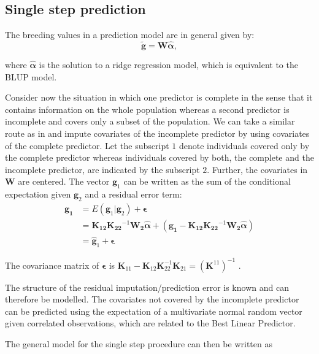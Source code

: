 \documentclass[12pt,titlepage]{article}
\begin{document}
\subsection{Single step prediction}
The breeding values in a prediction model are in general given by:
\begin{equation} \label{eq:mrnaebv}
	\mathbf{\tilde{g}} = \mathbf{W}\boldsymbol{\hat{\alpha}},
\end{equation}

where $\boldsymbol{\hat{\alpha}}$ is the solution to a ridge regression model,
which is equivalent to the BLUP model.

Consider now the situation in which one predictor is complete in the sense that
it contains information on the whole population whereas a second predictor is
incomplete and covers only a subset of the population.
We can take a similar route as in  and impute covariates 
of the incomplete predictor by using covariates of the complete predictor.
Let the subscript $1$ denote individuals covered only by the complete
predictor whereas individuals covered by both, the complete and the
incomplete predictor, are indicated by the subscript $2$.
Further, the covariates in $\mathbf{W}$ are centered.
The vector $\mathbf{g}_1$ can be written as the sum of the conditional 
expectation given $\mathbf{g}_2$ and a residual error term:
\begin{align} \label{eq:mrna1}
	\mathbf{g_1} &= E(\mathbf{g}_1|\mathbf{g}_2) + \boldsymbol{\epsilon} \\
	&= \mathbf{K_{12}}\mathbf{K_{22}}^{-1}\mathbf{W_2}\boldsymbol{\hat{\alpha}} + (\mathbf{g_1} - \mathbf{K_{12}}\mathbf{K_{22}}^{-1}\mathbf{W_2}\boldsymbol{\hat{\alpha}}) \\
	&= \mathbf{\hat{g}}_1 + \boldsymbol{\epsilon}
\end{align}

The covariance matrix of $\boldsymbol{\epsilon}$ is $\mathbf{K}_{11} - \mathbf{K}_{12}\mathbf{K}_{22}^{-1}\mathbf{K}_{21} = (\mathbf{K}^{11})^{-1}$
\cite{Legarra2009}.

The structure of the residual imputation/prediction error is known and can 
therefore be modelled.
The covariates not covered by the incomplete predictor can be predicted using 
the expectation of a multivariate normal random vector given correlated 
observations, which are related to the Best Linear Predictor.

The general model for the single step procedure can then be written as 
\end{document}
